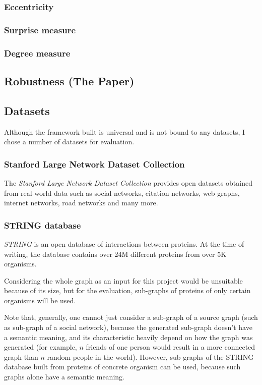 \subsubsection{Eccentricity}

\subsubsection{Surprise measure}

\subsubsection{Degree measure}

\subsection{Robustness (The Paper)}

\subsection{Datasets}

Although the framework built is universal and is not bound to any datasets, I chose a number of datasets for evaluation.

\subsubsection{Stanford Large Network Dataset Collection}

The \textit{Stanford Large Network Dataset Collection}\cite{Large2016} provides open datasets obtained from real-world data such as social networks, citation networks, web graphs, internet networks, road networks and many more.

\subsubsection{STRING database}

\textit{STRING}\cite{Szklarczyk2019} is an open database of interactions between proteins.
At the time of writing, the database contains over 24M different proteins from over 5K organisms.

Considering the whole graph as an input for this project would be unsuitable because of its size, but for the evaluation, sub-graphs of proteins of only certain organisms will be used.

Note that, generally, one cannot just consider a sub-graph of a source graph (such as sub-graph of a social network), because the generated sub-graph doesn't have a semantic meaning, and its characteristic heavily depend on how the graph was generated (for example, $n$ friends of one person would result in a more connected graph than $n$ random people in the world).
However, sub-graphs of the STRING database built from proteins of concrete organism can be used, because such graphs alone have a semantic meaning.

